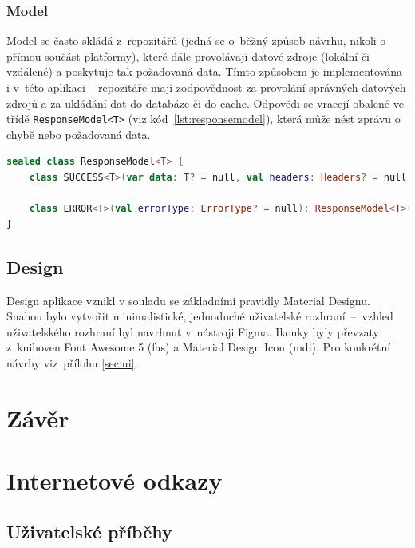 \documentclass[twoside]{ctuthesis}
\begin{document}
\subsection{Model}
Model se často skládá z~repozitářů (jedná se o~běžný způsob návrhu, nikoli o přímou součást platformy), které dále provolávají datové zdroje (lokální či vzdálené) a poskytuje tak požadovaná data. Tímto způsobem je implementována i v~této aplikaci -- repozitáře mají zodpovědnost za provolání správných datových zdrojů a za ukládání dat do databáze či do cache. Odpovědi se vracejí obalené ve třídě \texttt{ResponseModel<T>} (viz kód~\ref{lst:responsemodel}), která může nést zprávu o chybě nebo požadovaná data.

\begin{lstlisting}[language=Kotlin,caption={Třída \texttt{ResponseModel}},label={lst:responsemodel}]
sealed class ResponseModel<T> {
	class SUCCESS<T>(var data: T? = null, val headers: Headers? = null): ResponseModel<T>()

	class ERROR<T>(val errorType: ErrorType? = null): ResponseModel<T>()
}
\end{lstlisting}

\section{Design}\label{design}

Design aplikace vznikl v souladu se základními pravidly Material Designu. Snahou bylo vytvořit minimalistické, jednoduché uživatelské rozhraní~--~vzhled uživatelského rozhraní byl navrhnut v~nástroji Figma. Ikonky byly převzaty z~knihoven Font Awesome 5 (fas) a Material Design Icon (mdi). Pro konkrétní návrhy viz~přílohu \ref{sec:ui}.

\chapter*{Závěr}


\printbibliography[title={Seznam použité literatury}]

\appendix

\chapter{Internetové odkazy}
\section{Uživatelské příběhy}\label{sec:user-story}
\end{document}
